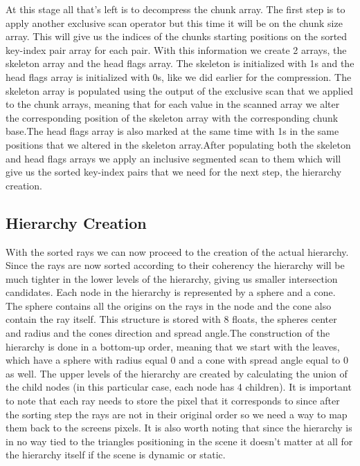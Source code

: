 \documentclass{llncs}
\begin{document}
At this stage all that's left is to decompress the chunk array. The first step is to apply another exclusive scan operator but this time it will be on the chunk size array. This will give us the indices of the chunks starting positions on the sorted key-index pair array for each pair. With this information we create 2 arrays, the skeleton array and the head flags array. The skeleton is initialized with 1s and the head flags array is initialized with 0s, like we did earlier for the compression. The skeleton array is populated using the output of the exclusive scan that we applied to the chunk arrays, meaning that for each value in the scanned array we alter the corresponding position of the skeleton array with the corresponding chunk base.The head flags array is also marked at the same time with 1s in the same positions that we altered in the skeleton array.After populating both the skeleton and head flags arrays we apply an inclusive segmented scan to them which will give us the sorted key-index pairs that we need for the next step, the hierarchy creation.


%
\subsection{Hierarchy Creation}
%

With the sorted rays we can now proceed to the creation of the actual hierarchy. Since the rays are now sorted according to their coherency the hierarchy will be much tighter in the lower levels of the hierarchy, giving us smaller intersection candidates.
Each node in the hierarchy is represented by a sphere and a cone. The sphere contains all the origins on the rays in the node and the cone also contain the ray itself. This structure  is stored with 8 floats, the spheres center and radius and the cones direction and spread angle.The construction of the hierarchy is done in a bottom-up order, meaning that we start with the leaves, which have a sphere with radius equal 0 and a cone with spread angle equal to 0 as well. The upper levels of the hierarchy are created by calculating the union of the child nodes (in this particular case, each node has 4 children). It is important to note that each ray needs to store the pixel that it corresponds to since after the sorting step the rays are not in their original order so we need a way to map them back to the screens pixels. It is also worth noting that since the hierarchy is in no way tied to the triangles positioning in the scene it doesn't matter at all for the hierarchy itself  if the scene is dynamic or static.
\end{document}

